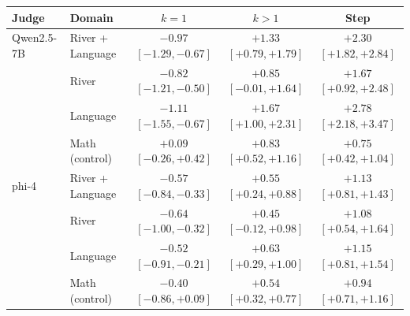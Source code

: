 \begin{tabular}{llccc}
\toprule
Judge & Domain & $k{=}1$ & $k{>}1$ & Step \\
\midrule
Qwen2.5-7B & River + Language & $-0.97$ {\scriptsize$[-1.29,-0.67]$} & $+1.33$ {\scriptsize$[+0.79,+1.79]$} & $+2.30$ {\scriptsize$[+1.82,+2.84]$} \\
 & \quad River & $-0.82$ {\scriptsize$[-1.21,-0.50]$} & $+0.85$ {\scriptsize$[-0.01,+1.64]$} & $+1.67$ {\scriptsize$[+0.92,+2.48]$} \\
 & \quad Language & $-1.11$ {\scriptsize$[-1.55,-0.67]$} & $+1.67$ {\scriptsize$[+1.00,+2.31]$} & $+2.78$ {\scriptsize$[+2.18,+3.47]$} \\
 & Math (control) & $+0.09$ {\scriptsize$[-0.26,+0.42]$} & $+0.83$ {\scriptsize$[+0.52,+1.16]$} & $+0.75$ {\scriptsize$[+0.42,+1.04]$} \\
\addlinespace
phi-4 & River + Language & $-0.57$ {\scriptsize$[-0.84,-0.33]$} & $+0.55$ {\scriptsize$[+0.24,+0.88]$} & $+1.13$ {\scriptsize$[+0.81,+1.43]$} \\
 & \quad River & $-0.64$ {\scriptsize$[-1.00,-0.32]$} & $+0.45$ {\scriptsize$[-0.12,+0.98]$} & $+1.08$ {\scriptsize$[+0.54,+1.64]$} \\
 & \quad Language & $-0.52$ {\scriptsize$[-0.91,-0.21]$} & $+0.63$ {\scriptsize$[+0.29,+1.00]$} & $+1.15$ {\scriptsize$[+0.81,+1.54]$} \\
 & Math (control) & $-0.40$ {\scriptsize$[-0.86,+0.09]$} & $+0.54$ {\scriptsize$[+0.32,+0.77]$} & $+0.94$ {\scriptsize$[+0.71,+1.16]$} \\
\bottomrule
\end{tabular}

